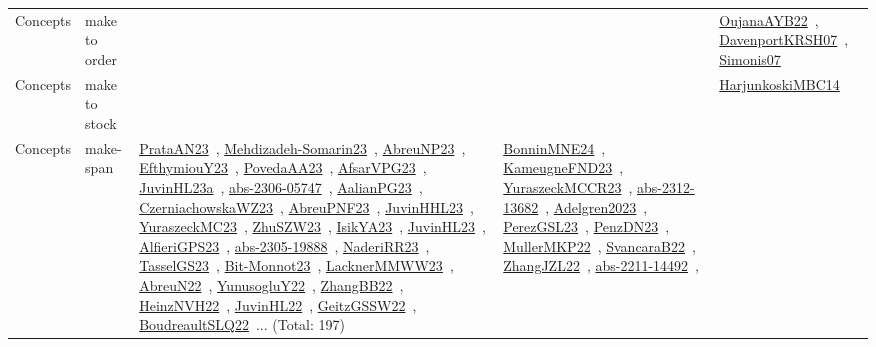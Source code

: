 {\begin{longtable}{lp{3cm}>{\raggedright\arraybackslash}p{6cm}>{\raggedright\arraybackslash}p{6cm}>{\raggedright\arraybackslash}p{8cm}}
Concepts & make to order &  &  & \href{../works/OujanaAYB22.pdf}{OujanaAYB22}~\cite{OujanaAYB22}, \href{../works/DavenportKRSH07.pdf}{DavenportKRSH07}~\cite{DavenportKRSH07}, \href{../works/Simonis07.pdf}{Simonis07}~\cite{Simonis07}\\
Concepts & make to stock &  &  & \href{../works/HarjunkoskiMBC14.pdf}{HarjunkoskiMBC14}~\cite{HarjunkoskiMBC14}\\
Concepts & make-span & \href{../works/PrataAN23.pdf}{PrataAN23}~\cite{PrataAN23}, \href{../works/Mehdizadeh-Somarin23.pdf}{Mehdizadeh-Somarin23}~\cite{Mehdizadeh-Somarin23}, \href{../works/AbreuNP23.pdf}{AbreuNP23}~\cite{AbreuNP23}, \href{../works/EfthymiouY23.pdf}{EfthymiouY23}~\cite{EfthymiouY23}, \href{../works/PovedaAA23.pdf}{PovedaAA23}~\cite{PovedaAA23}, \href{../works/AfsarVPG23.pdf}{AfsarVPG23}~\cite{AfsarVPG23}, \href{../works/JuvinHL23a.pdf}{JuvinHL23a}~\cite{JuvinHL23a}, \href{../works/abs-2306-05747.pdf}{abs-2306-05747}~\cite{abs-2306-05747}, \href{../works/AalianPG23.pdf}{AalianPG23}~\cite{AalianPG23}, \href{../works/CzerniachowskaWZ23.pdf}{CzerniachowskaWZ23}~\cite{CzerniachowskaWZ23}, \href{../works/AbreuPNF23.pdf}{AbreuPNF23}~\cite{AbreuPNF23}, \href{../works/JuvinHHL23.pdf}{JuvinHHL23}~\cite{JuvinHHL23}, \href{../works/YuraszeckMC23.pdf}{YuraszeckMC23}~\cite{YuraszeckMC23}, \href{../works/ZhuSZW23.pdf}{ZhuSZW23}~\cite{ZhuSZW23}, \href{../works/IsikYA23.pdf}{IsikYA23}~\cite{IsikYA23}, \href{../works/JuvinHL23.pdf}{JuvinHL23}~\cite{JuvinHL23}, \href{../works/AlfieriGPS23.pdf}{AlfieriGPS23}~\cite{AlfieriGPS23}, \href{../works/abs-2305-19888.pdf}{abs-2305-19888}~\cite{abs-2305-19888}, \href{../works/NaderiRR23.pdf}{NaderiRR23}~\cite{NaderiRR23}, \href{../works/TasselGS23.pdf}{TasselGS23}~\cite{TasselGS23}, \href{../works/Bit-Monnot23.pdf}{Bit-Monnot23}~\cite{Bit-Monnot23}, \href{../works/LacknerMMWW23.pdf}{LacknerMMWW23}~\cite{LacknerMMWW23}, \href{../works/AbreuN22.pdf}{AbreuN22}~\cite{AbreuN22}, \href{../works/YunusogluY22.pdf}{YunusogluY22}~\cite{YunusogluY22}, \href{../works/ZhangBB22.pdf}{ZhangBB22}~\cite{ZhangBB22}, \href{../works/HeinzNVH22.pdf}{HeinzNVH22}~\cite{HeinzNVH22}, \href{../works/JuvinHL22.pdf}{JuvinHL22}~\cite{JuvinHL22}, \href{../works/GeitzGSSW22.pdf}{GeitzGSSW22}~\cite{GeitzGSSW22}, \href{../works/BoudreaultSLQ22.pdf}{BoudreaultSLQ22}~\cite{BoudreaultSLQ22}... (Total: 197) & \href{../works/BonninMNE24.pdf}{BonninMNE24}~\cite{BonninMNE24}, \href{../works/KameugneFND23.pdf}{KameugneFND23}~\cite{KameugneFND23}, \href{../works/YuraszeckMCCR23.pdf}{YuraszeckMCCR23}~\cite{YuraszeckMCCR23}, \href{../works/abs-2312-13682.pdf}{abs-2312-13682}~\cite{abs-2312-13682}, \href{../works/Adelgren2023.pdf}{Adelgren2023}~\cite{Adelgren2023}, \href{../works/PerezGSL23.pdf}{PerezGSL23}~\cite{PerezGSL23}, \href{../works/PenzDN23.pdf}{PenzDN23}~\cite{PenzDN23}, \href{../works/MullerMKP22.pdf}{MullerMKP22}~\cite{MullerMKP22}, \href{../works/SvancaraB22.pdf}{SvancaraB22}~\cite{SvancaraB22}, \href{../works/ZhangJZL22.pdf}{ZhangJZL22}~\cite{ZhangJZL22}, \href{../works/abs-2211-14492.pdf}{abs-2211-14492}~\cite{abs-2211-14492}, 
\end{longtable}}
